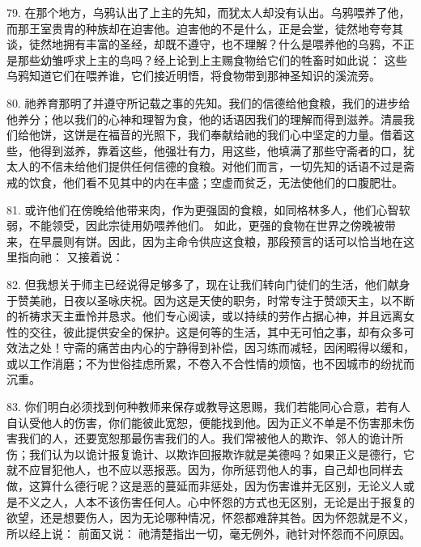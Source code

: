 79. 在那个地方，乌鸦认出了上主的先知，而犹太人却没有认出。乌鸦喂养了他，而那王室贵胄的种族却在迫害他。迫害他的不是什么，正是会堂，徒然地夸夸其谈，徒然地拥有丰富的圣经，却既不遵守，也不理解？什么是喂养他的乌鸦，不正是那些幼雏呼求上主的鸟吗？经上论到上主赐食物给它们的牲畜时如此说： 这些乌鸦知道它们在喂养谁，它们接近明悟，将食物带到那神圣知识的溪流旁。\par

80. 祂养育那明了并遵守所记载之事的先知。我们的信德给他食粮，我们的进步给他养分；他以我们的心神和理智为食，他的话语因我们的理解而得到滋养。清晨我们给他饼，这饼是在福音的光照下，我们奉献给祂的我们心中坚定的力量。借着这些，他得到滋养，靠着这些，他强壮有力，用这些，他填满了那些守斋者的口，犹太人的不信未给他们提供任何信德的食粮。对他们而言，一切先知的话语不过是斋戒的饮食，他们看不见其中的内在丰盛；空虚而贫乏，无法使他们的口腹肥壮。\par

81. 或许他们在傍晚给他带来肉，作为更强固的食粮，如同格林多人，他们心智软弱，不能领受，因此宗徒用奶喂养他们。 如此，更强的食物在世界之傍晚被带来，在早晨则有饼。因此，因为主命令供应这食粮，那段预言的话可以恰当地在这里指向祂： 又接着说：\par

82. 但我想关于师主已经说得足够多了，现在让我们转向门徒们的生活，他们献身于赞美祂，日夜以圣咏庆祝。因为这是天使的职务，时常专注于赞颂天主，以不断的祈祷求天主垂怜并恳求。他们专心阅读，或以持续的劳作占据心神，并且远离女性的交往，彼此提供安全的保护。这是何等的生活，其中无可怕之事，却有众多可效法之处！守斋的痛苦由内心的宁静得到补偿，因习练而减轻，因闲暇得以缓和，或以工作消磨；不为世俗挂虑所累，不卷入不合性情的烦恼，也不因城市的纷扰而沉重。\par

83. 你们明白必须找到何种教师来保存或教导这恩赐，我们若能同心合意，若有人自认受他人的伤害，你们能彼此宽恕，便能找到他。因为正义不单是不伤害那未伤害我们的人，还要宽恕那最伤害我们的人。我们常被他人的欺诈、邻人的诡计所伤；我们认为以诡计报复诡计、以欺诈回报欺诈就是美德吗？如果正义是德行，它就不应冒犯他人，也不应以恶报恶。因为，你所惩罚他人的事，自己却也同样去做，这算什么德行呢？这是恶的蔓延而非惩处，因为伤害谁并无区别，无论义人或是不义之人，人本不该伤害任何人。心中怀怨的方式也无区别，无论是出于报复的欲望，还是想要伤人，因为无论哪种情况，怀怨都难辞其咎。因为怀怨就是不义，所以经上说： 前面又说： 祂清楚指出一切，毫无例外，祂针对怀怨而不问原因。\par


